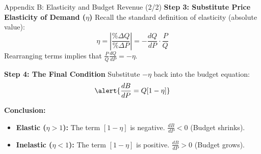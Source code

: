 \documentclass[10pt]{beamer}
\begin{document}
\begin{frame}{Appendix B: Elasticity and Budget Revenue (2/2)}
\textbf{Step 3: Substitute Price Elasticity of Demand ($\eta$)}
Recall the standard definition of elasticity (absolute value):
\[
\eta = \left| \frac{\%\Delta Q}{\%\Delta P} \right| = - \frac{dQ}{dP} \cdot \frac{P}{Q}
\]
Rearranging terms implies that $\frac{P}{Q} \frac{dQ}{dP} = -\eta$.

\vspace{0.3cm}

\textbf{Step 4: The Final Condition}
Substitute $-\eta$ back into the budget equation:
\[
\alert{\frac{dB}{dP} = Q [ 1 - \eta ]}
\]

\textbf{Conclusion:}
\begin{itemize}
\item \textbf{Elastic ($\eta > 1$):} The term $[1-\eta]$ is negative. $\frac{dB}{dP} < 0$ (Budget shrinks).
\item \textbf{Inelastic ($\eta < 1$):} The term $[1-\eta]$ is positive. $\frac{dB}{dP} > 0$ (Budget grows).
\end{itemize}
\end{frame}
\end{document}
